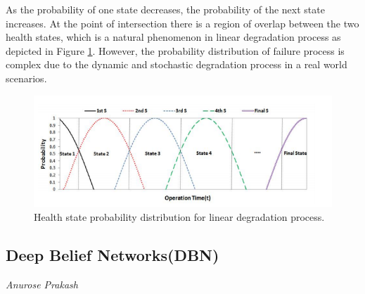 As the probability of one state decreases, the probability of the next state increases. At the point of intersection there is a region of overlap between the two health states, which is a natural phenomenon in linear degradation process as depicted in Figure \ref{fig:SVM structure2}. However, the probability distribution of failure process is complex due to the dynamic and stochastic degradation process in a real world scenarios.
\begin{figure}[ht]
	\centering
	\includegraphics[scale=0.9]{gfx/svm_2.PNG}
    \captionsetup{justification=centering}
	\caption{Health state probability distribution for linear degradation process. \cite{Kim2010MachinePB}}
	\label{fig:SVM structure2}
\end{figure}

\subsection{Deep Belief Networks(DBN)}
\vspace*{-12mm}\hfill{\normalsize\emph{Anurose Prakash}}

